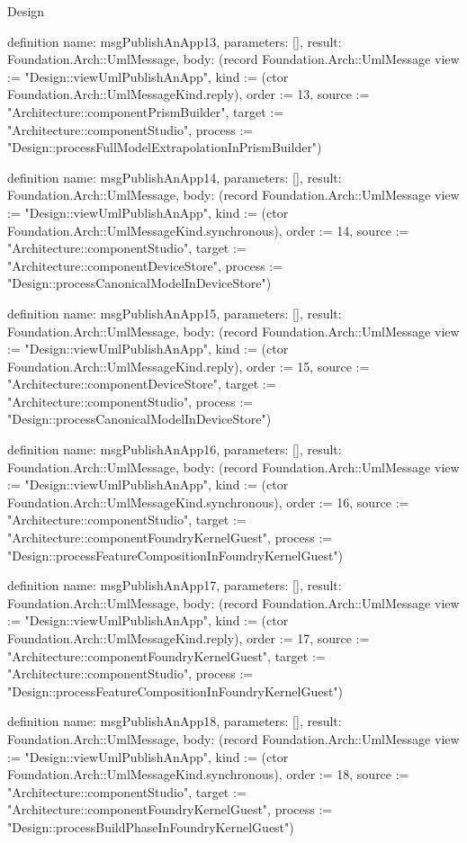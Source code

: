 \begin{lexlean}{Design}
\begin{semanticmodule}
definition{
  name: msgPublishAnApp13,
  parameters: [],
  result: Foundation.Arch::UmlMessage,
  body: (record Foundation.Arch::UmlMessage {view := "Design::viewUmlPublishAnApp", kind := (ctor Foundation.Arch::UmlMessageKind.reply), order := 13, source := "Architecture::componentPrismBuilder", target := "Architecture::componentStudio", process := "Design::processFullModelExtrapolationInPrismBuilder"})
}

definition{
  name: msgPublishAnApp14,
  parameters: [],
  result: Foundation.Arch::UmlMessage,
  body: (record Foundation.Arch::UmlMessage {view := "Design::viewUmlPublishAnApp", kind := (ctor Foundation.Arch::UmlMessageKind.synchronous), order := 14, source := "Architecture::componentStudio", target := "Architecture::componentDeviceStore", process := "Design::processCanonicalModelInDeviceStore"})
}

definition{
  name: msgPublishAnApp15,
  parameters: [],
  result: Foundation.Arch::UmlMessage,
  body: (record Foundation.Arch::UmlMessage {view := "Design::viewUmlPublishAnApp", kind := (ctor Foundation.Arch::UmlMessageKind.reply), order := 15, source := "Architecture::componentDeviceStore", target := "Architecture::componentStudio", process := "Design::processCanonicalModelInDeviceStore"})
}

definition{
  name: msgPublishAnApp16,
  parameters: [],
  result: Foundation.Arch::UmlMessage,
  body: (record Foundation.Arch::UmlMessage {view := "Design::viewUmlPublishAnApp", kind := (ctor Foundation.Arch::UmlMessageKind.synchronous), order := 16, source := "Architecture::componentStudio", target := "Architecture::componentFoundryKernelGuest", process := "Design::processFeatureCompositionInFoundryKernelGuest"})
}

definition{
  name: msgPublishAnApp17,
  parameters: [],
  result: Foundation.Arch::UmlMessage,
  body: (record Foundation.Arch::UmlMessage {view := "Design::viewUmlPublishAnApp", kind := (ctor Foundation.Arch::UmlMessageKind.reply), order := 17, source := "Architecture::componentFoundryKernelGuest", target := "Architecture::componentStudio", process := "Design::processFeatureCompositionInFoundryKernelGuest"})
}

definition{
  name: msgPublishAnApp18,
  parameters: [],
  result: Foundation.Arch::UmlMessage,
  body: (record Foundation.Arch::UmlMessage {view := "Design::viewUmlPublishAnApp", kind := (ctor Foundation.Arch::UmlMessageKind.synchronous), order := 18, source := "Architecture::componentStudio", target := "Architecture::componentFoundryKernelGuest", process := "Design::processBuildPhaseInFoundryKernelGuest"})
}


\end{semanticmodule}
\end{lexlean}
